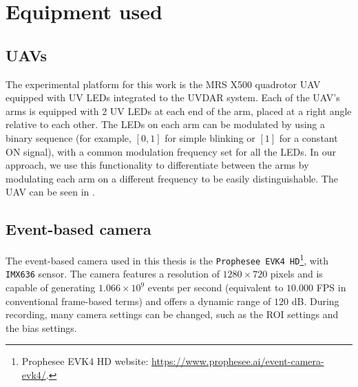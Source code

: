 \section{Equipment used}

\subsection{UAVs}
The experimental platform for this work is the MRS X500\cite{hertmrs} quadrotor \ac{UAV} equipped with \ac{UV} \ac{LED}s
integrated to the UVDAR\cite{walteruvdar} system.
Each of the \ac{UAV}'s arms is equipped with 2 \ac{UV} \ac{LED}s at each end of the arm, placed at a right angle relative to each other.
The \ac{LED}s on each arm can be modulated
by using a binary sequence (for example, $[0, 1]$ for simple blinking or $[1]$ for a constant ON signal), with a common modulation frequency set for all the \ac{LED}s.
In our approach, we use this functionality to differentiate between the arms by modulating each arm on a different frequency to be easily distinguishable.
The \ac{UAV} can be seen in .

\subsection{Event-based camera}
The event-based camera used in this thesis is the \texttt{Prophesee EVK4 HD}\footnote{Prophesee EVK4 HD website: \url{https://www.prophesee.ai/event-camera-evk4/}.}\cite{propheseeevk4},
with \texttt{IMX636} sensor. The camera features a resolution of $1280 \times 720$ pixels and is capable of generating $1.066\times10^9$ events per second (equivalent to $10.000$ \ac{FPS} in conventional frame-based terms) and offers a dynamic range of $120$ dB.
During recording, many camera settings can be changed, such as the \ac{ROI} settings and the bias settings.


